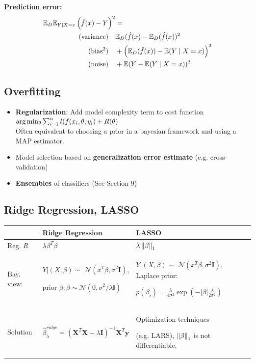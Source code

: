 \vspace{1em}
\textbf{Prediction error: }
\begin{align*}
		\mathbb E_D\mathbb E_{Y\mid X=x}\left(\hat f(x) - Y\right)^2 &=\\
	(\text{variance})\quad &\mathbb E_D(\hat f(x) - \mathbb E_D(\hat f(x))^2 \\
	(\text{bias$^2$})\quad &+ \left(\mathbb E_D(\hat f(x)) - \mathbb E(Y\mid X=x)\right)^2 \\
	(\text{noise})\quad &+  \mathbb E(Y - \mathbb E(Y\mid X=x))^2
\end{align*}

\subsection{Overfitting}
\begin{itemize}
	\item \textbf{Regularization}: Add model complexity term to cost function 
	$\arg\min_\theta\sum_{i = 1}^{n} l(f(x_i, \theta, y_i) + R(\theta) $\\
	Often equivalent to choosing a prior in a bayesian framework and using a MAP estimator.
	\item Model selection based on \textbf{generalization error estimate} (e.g. cross-validation)
	\item \textbf{Ensembles} of classifiers (See Section 9)
\end{itemize}



\subsection{Ridge Regression, LASSO}
\begin{center}
{\footnotesize
	\begin{tabular}{ p{} | p{} | p{} } 
		& \textbf{Ridge Regression} & \textbf{LASSO}\\\hline
			
		Reg. $R$ & $\lambda\beta^T\beta$ & $\lambda\left\lVert\beta\right\rVert_1$ \\\hline
		Bay. view: & $Y | (X, \beta) \sim$ $\mathcal N(x^T\beta, \sigma^2\mathbf I)$, 
		
		prior $\beta: \beta\sim\mathcal N(0, \sigma^2 / \lambda\mathbb I)$ & 
			$Y | (X, \beta) \sim$ $\mathcal N(x^T\beta, \sigma^2\mathbf I)$, Laplace prior:
			
			 $p(\beta_i) = \frac{\lambda}{4\sigma^2}\exp(-|\beta|\frac{\lambda}{2\sigma^2})$
		\\\hline
		Solution & $\hat\beta_\lambda^{\textit{ridge}} = (\mathbf X^T\mathbf X + \lambda\mathbf I)^{-1}\mathbf X^T\mathbf y$ & Optimization techniques 
		
			(e.g. LARS), $\left\lVert\beta\right\rVert_1$ is not differentiable. \\\hline
	\end{tabular}
	}
\end{center}

